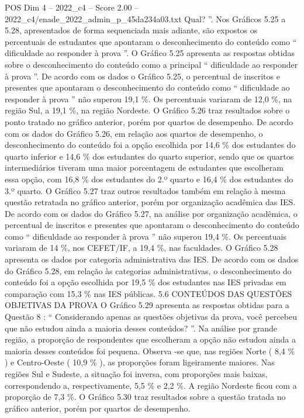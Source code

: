 \begin{textsample}{POS Dim 4 – 2022\_c4 – Score 2.00 – 2022\_c4/enade\_2022\_admin\_p\_45da234a03.txt}
Qual? ”.
Nos Gráficos 5.25 a 5.28, apresentados de forma sequenciada mais adiante, são expostos os percentuais de estudantes que apontaram o desconhecimento do conteúdo como “ dificuldade ao responder à prova ”.
O Gráfico 5.25 apresenta as respostas obtidas sobre o desconhecimento do conteúdo como a principal “ dificuldade ao responder à prova ”.
De acordo com os dados o Gráfico 5.25, o percentual de inscritos e presentes que apontaram o desconhecimento do conteúdo como “ dificuldade ao responder à prova ” não superou 19,1 \%.
Os percentuais variaram de 12,0 \%, na região Sul, a 19,1 \%, na região Nordeste.
O Gráfico 5.26 traz resultados sobre o ponto tratado no gráfico anterior, porém por quartos de desempenho.
De acordo com os dados do Gráfico 5.26, em relação aos quartos de desempenho, o desconhecimento do conteúdo foi a opção escolhida por 14,6 \% dos estudantes do quarto inferior e 14,6 \% dos estudantes do quarto superior, sendo que os quartos intermediários tiveram uma maior porcentagem de estudantes que escolheram essa opção, com 16,8 \% dos estudantes do 2.º quarto e 16,4 \% dos estudantes do 3.º quarto.
O Gráfico 5.27 traz outros resultados também em relação à mesma questão retratada no gráfico anterior, porém por organização acadêmica das IES.
De acordo com os dados do Gráfico 5.27, na análise por organização acadêmica, o percentual de inscritos e presentes que apontaram o desconhecimento do conteúdo como “ dificuldade ao responder à prova ” não superou 19,4 \%.
Os percentuais variaram de 14 \%, nos CEFET/IF, a 19,4 \%, nas faculdades.
O Gráfico 5.28 apresenta os dados por categoria administrativa das IES.
De acordo com os dados do Gráfico 5.28, em relação às categorias administrativas, o desconhecimento do conteúdo foi a opção escolhida por 19,5 \% dos estudantes nas IES privadas em comparação com 15,3 \% nas IES públicas. 5.6 CONTEÚDOS DAS QUESTÕES OBJETIVAS DA PROVA O Gráfico 5.29 apresenta as respostas obtidas para a Questão 8 : “ Considerando apenas as questões objetivas da prova, você percebeu que não estudou ainda a maioria desses conteúdos? ”.
Na análise por grande região, a proporção de respondentes que escolheram a opção não estudou ainda a maioria desses conteúdos foi pequena.
Observa -se que, nas regiões Norte ( 8,4 \% ) e Centro-Oeste ( 10,9 \% ), as proporções foram ligeiramente maiores.
Nas regiões Sul e Sudeste, a situação foi inversa, com proporções mais baixas, correspondendo a, respectivamente, 5,5 \% e 2,2 \%.
A região Nordeste ficou com a proporção de 7,3 \%.
O Gráfico 5.30 traz resultados sobre a questão tratada no gráfico anterior, porém por quartos de desempenho.

\end{textsample}
